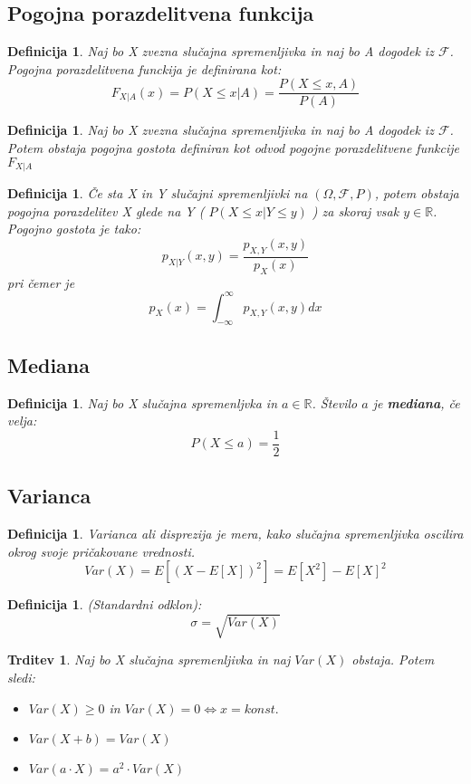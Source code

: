 \documentclass[11pt]{article}
\newtheorem{Trditev}[Izrek]{{\sc Trditev}}
\newtheorem{Definicija}[Izrek]{{\sc Definicija}}
\begin{document}
\subsection{Pogojna porazdelitvena funkcija}
\begin{Definicija}
Naj bo X zvezna slučajna spremenljivka in naj bo A dogodek iz $\mathcal{F}$. Pogojna porazdelitvena funckija je definirana kot:
$$F_{X|A}(x) = P(X\le x | A) = \frac{P(X\le x, A)}{P(A)}$$
\end{Definicija}
\begin{Definicija}
Naj bo X zvezna slučajna spremenljivka in naj bo A dogodek iz $\mathcal{F}$. Potem obstaja pogojna gostota definiran kot odvod pogojne porazdelitvene funkcije $F_{X|A}$
\end{Definicija}
\begin{Definicija}
Če sta X in Y slučajni spremenljivki na $(\Omega,\mathcal{F},P)$, potem obstaja pogojna porazdelitev X glede na Y ( $  P(X \le x | Y \le y) $ ) za skoraj vsak $y\in \mathbb{R}$. Pogojno gostota je tako:
$$p_{X|Y}(x,y) = \frac{p_{X,Y}(x,y)}{p_X(x)}$$
pri čemer je $$p_X(x) = \int_{-\infty}^{\infty} p_{X,Y}(x,y) dx$$ 
\end{Definicija}
\subsection{Mediana}
\begin{Definicija}
Naj bo X slučajna spremenljvka in $a\in \mathbb{R}$. Število $a$ je \textbf{mediana}, če velja: $$P(X\le a) = \frac{1}{2}$$
\end{Definicija}
\subsection{Varianca}
\begin{Definicija}
Varianca ali disprezija je mera, kako slučajna spremenljivka oscilira okrog svoje pričakovane vrednosti. $$Var(X) = E [( X - E[X])^2] = E[X^2] - E[X]^2$$
\end{Definicija}
\begin{Definicija}
(Standardni odklon):
$$\sigma = \sqrt{Var(X)}$$
\end{Definicija}
\begin{Trditev}
Naj bo X slučajna spremenljivka in naj $Var(X)$ obstaja. Potem sledi:
\begin{itemize}
\item
$Var(X) \ge 0$ in $Var(X) = 0 \iff x = konst.$
\item
$Var(X + b) = Var(X)$
\item
$Var(a \cdot X) = a^2 \cdot Var(X)$
\end{itemize}
\end{Trditev}
\end{document}

